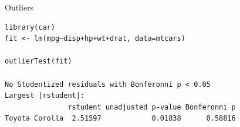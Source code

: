 \begin{frame}[fragile]{Outliers}
\scriptsize
\begin{verbatim}
library(car)
fit <- lm(mpg~disp+hp+wt+drat, data=mtcars)

outlierTest(fit)

No Studentized residuals with Bonferonni p < 0.05
Largest |rstudent|:
               rstudent unadjusted p-value Bonferonni p
Toyota Corolla  2.51597            0.01838      0.58816
\end{verbatim}
\begin{center}
\end{center}
\end{frame}

